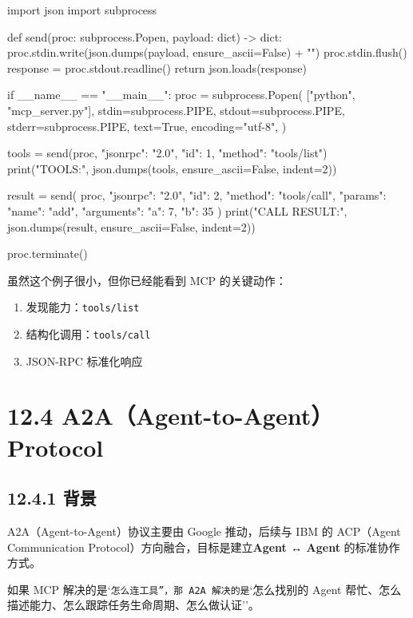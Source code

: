 \begin{codeblock}
import json
import subprocess


def send(proc: subprocess.Popen, payload: dict) -> dict:
    proc.stdin.write(json.dumps(payload, ensure_ascii=False) + "\n")
    proc.stdin.flush()
    response = proc.stdout.readline()
    return json.loads(response)


if __name__ == "__main__":
    proc = subprocess.Popen(
        ["python", "mcp_server.py"],
        stdin=subprocess.PIPE,
        stdout=subprocess.PIPE,
        stderr=subprocess.PIPE,
        text=True,
        encoding="utf-8",
    )

    tools = send(proc, {"jsonrpc": "2.0", "id": 1, "method": "tools/list"})
    print("TOOLS:", json.dumps(tools, ensure_ascii=False, indent=2))

    result = send(
        proc,
        {
            "jsonrpc": "2.0",
            "id": 2,
            "method": "tools/call",
            "params": {
                "name": "add",
                "arguments": {"a": 7, "b": 35}
            }
        }
    )
    print("CALL RESULT:", json.dumps(result, ensure_ascii=False, indent=2))

    proc.terminate()
\end{codeblock}

虽然这个例子很小，但你已经能看到 MCP 的关键动作：


\begin{enumerate}[leftmargin=2em]
\item 发现能力：\texttt{tools/list}
\item 结构化调用：\texttt{tools/call}
\item JSON-RPC 标准化响应
\end{enumerate}

\section{12.4 A2A（Agent-to-Agent）Protocol}

\subsection{12.4.1 背景}

A2A（Agent-to-Agent）协议主要由 Google 推动，后续与 IBM 的 ACP（Agent Communication Protocol）方向融合，目标是建立\textbf{Agent ↔ Agent} 的标准协作方式。


如果 MCP 解决的是`\texttt{怎么连工具''，那 A2A 解决的是}`怎么找别的 Agent 帮忙、怎么描述能力、怎么跟踪任务生命周期、怎么做认证''。


